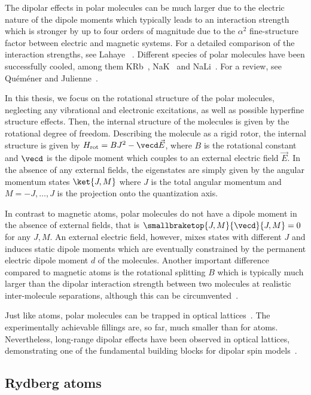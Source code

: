 The dipolar effects in polar molecules can be much larger due to the
electric nature of the dipole moments which typically leads to an interaction strength which
is stronger by up to four orders of magnitude due to the $\alpha^2$ fine-structure factor between electric
and magnetic systems. For a detailed comparison of the interaction strengths,
see Lahaye \etal~\cite{Lahaye2009}. Different species of polar molecules have been successfully cooled, among
them KRb~\cite{Ni2008b,Ospelkaus2010}, NaK~\cite{Wu2012a} and NaLi~\cite{Heo2012}. For a review,
see Quéméner and Julienne~\cite{Quemener2012}.

In this thesis, we focus on the rotational structure of the polar molecules,
neglecting any vibrational and electronic excitations, as well as possible hyperfine structure
effects. Then, the internal structure of the molecules is given by the rotational degree
of freedom. Describing the molecule as a rigid rotor, the internal structure is given by
$H_\text{rot}=B J^2 - \vecd \vec{E}$, where $B$ is the rotational constant and $\vecd$ is the
dipole moment which couples to an external electric field $\vec{E}$. In the absence of any external
fields, the eigenstates are simply given by the angular momentum states $\ket{J,M}$ where $J$ is
the total angular momentum and $M=-J, \dots, J$ is the projection onto the quantization axis.

In contrast to magnetic atoms, polar molecules do not have a dipole moment in the absence of
external fields, that is $\smallbraketop{J,M}{\vecd}{J,M}=0$ for any $J, M$. An external electric
field, however, mixes states with different $J$ and induces static dipole moments which are
eventually constrained by the permanent electric dipole moment $d$ of the molecules. Another important
difference compared to magnetic atoms is the rotational splitting $B$ which is typically much
larger than the dipolar interaction strength between two molecules at realistic
inter-molecule separations, although this can be circumvented~\cite{Klinsmann2014}.

Just like atoms, polar molecules can be trapped in optical lattices~\cite{Chotia2012}. The
experimentally achievable fillings are, so far, much smaller than for atoms. Nevertheless,
long-range dipolar effects have been observed in optical lattices, demonstrating one of the
fundamental building blocks for dipolar spin models~\cite{Yan2013}.

\subsection{Rydberg atoms}


